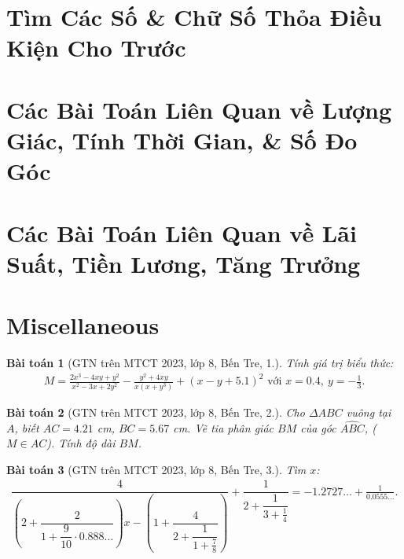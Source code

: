 \documentclass{article}
\newtheorem{baitoan}{Bài toán}
\begin{document}

\section{Tìm Các Số \& Chữ Số Thỏa Điều Kiện Cho Trước}


\section{Các Bài Toán Liên Quan về Lượng Giác, Tính Thời Gian, \& Số Đo Góc}


\section{Các Bài Toán Liên Quan về Lãi Suất, Tiền Lương, Tăng Trưởng}


\section{Miscellaneous}

\begin{baitoan}[GTN trên MTCT 2023, lớp 8, Bến Tre, 1.]
	Tính giá trị biểu thức:
	\begin{align*}
		M = \frac{2x^3 - 4xy + y^2}{x^2 - 3x + 2y^2} - \frac{y^2 + 4xy}{x(x + y^3)} + (x - y + 5.1)^2\mbox{ với } x = 0.4,\ y = -\frac{1}{3}.
	\end{align*}
\end{baitoan}

\begin{baitoan}[GTN trên MTCT 2023, lớp 8, Bến Tre, 2.]
	Cho $\Delta ABC$ vuông tại $A$, biết $AC = 4.21$ \emph{cm}, $BC = 5.67$ \emph{cm}. Vẽ tia phân giác $BM$ của góc $\widehat{ABC}$, ($M\in AC$). Tính độ dài $BM$.
\end{baitoan}

\begin{baitoan}[GTN trên MTCT 2023, lớp 8, Bến Tre, 3.]
	Tìm $x$:
	\begin{align*}
		\dfrac{4}{\left(2 + \dfrac{2}{1 + \dfrac{9}{10}\cdot0.888\ldots}\right)x - \left(1 + \dfrac{4}{2 + \dfrac{1}{1 + \frac{7}{8}}}\right)} + \dfrac{1}{2 + \dfrac{1}{3 + \frac{1}{4}}} = -1.2727\ldots + \frac{1}{0.0555\ldots}.
	\end{align*}
\end{baitoan}
\end{document}
